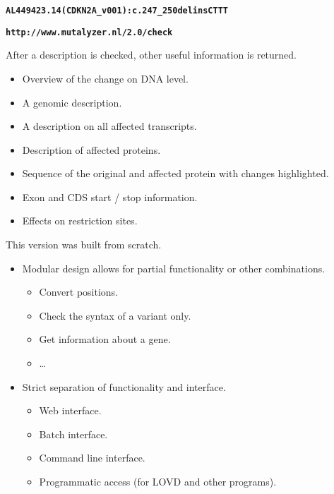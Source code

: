 \documentclass[a4, portrait]{seminar}
\newcommand{\bt}[1]{\texttt{\textbf{#1}}}
\begin{document}
\begin{slide}

  \bigskip
  \bigskip
  \bigskip
  \bigskip
  \bigskip
  \begin{center}
    \bt{AL449423.14(CDKN2A\_v001):c.247\_250delins\yellow CTTT\white}

    \bigskip
    \bt{http://www.mutalyzer.nl/2.0/check}
  \end{center}
  \vfill
\end{slide}
  
\begin{slide}

  After a description is checked, other useful information is returned.
  \begin{itemize}
    \item Overview of the change on DNA level.
    \item A genomic description.
    \item A description on all affected transcripts.
    \item Description of affected proteins.
    \item Sequence of the original and affected protein with changes 
      highlighted.
    \item Exon and CDS start / stop information.
    \item Effects on restriction sites.
  \end{itemize}

  \vfill
\end{slide}

\begin{slide}

  This version was built from scratch.
  \begin{itemize}
    \item Modular design allows for partial functionality or other combinations.
    \begin{itemize}
      \item Convert positions.
      \item Check the syntax of a variant only.
      \item Get information about a gene.
      \item \ldots
    \end{itemize}
    \item Strict separation of functionality and interface.
    \begin{itemize}
      \item Web interface.
      \item Batch interface.
      \item Command line interface.
      \item Programmatic access (for LOVD and other programs).
    \end{itemize}
  \end{itemize}

  \vfill
\end{slide}
\end{document}
